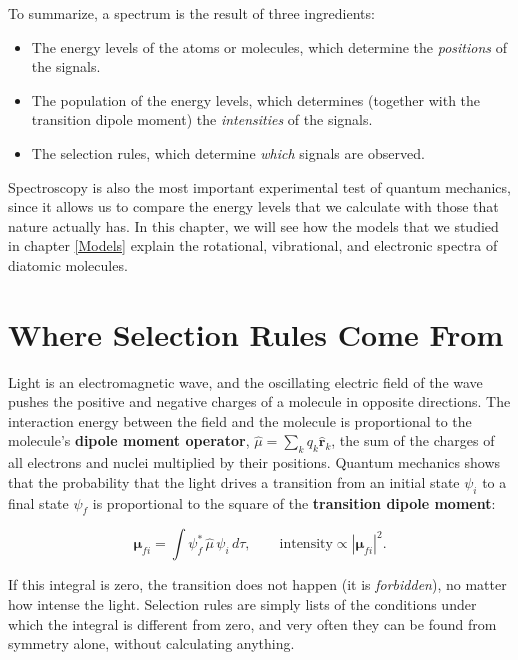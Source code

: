 \documentclass[
  english,
  9pt,
]{extbook}
\providecommand{\tightlist}{%
  \setlength{\itemsep}{0pt}\setlength{\parskip}{0pt}}
\theoremstyle{definition}
\theoremstyle{definition}
\theoremstyle{definition}
\theoremstyle{definition}
\theoremstyle{remark}
\begin{document}
To summarize, a spectrum is the result of three ingredients:

\begin{itemize}
\tightlist
\item
  The energy levels of the atoms or molecules, which determine the \emph{positions} of the signals.
\item
  The population of the energy levels, which determines (together with the transition dipole moment) the \emph{intensities} of the signals.
\item
  The selection rules, which determine \emph{which} signals are observed.
\end{itemize}

Spectroscopy is also the most important experimental test of quantum mechanics, since it allows us to compare the energy levels that we calculate with those that nature actually has. In this chapter, we will see how the models that we studied in chapter \ref{Models} explain the rotational, vibrational, and electronic spectra of diatomic molecules.

\section{Where Selection Rules Come From}\label{SelectionRules}

Light is an electromagnetic wave, and the oscillating electric field of the wave pushes the positive and negative charges of a molecule in opposite directions. The interaction energy between the field and the molecule is proportional to the molecule's \textbf{dipole moment operator}, \(\hat{\mu} = \sum_k q_k \hat{\mathbf{r}}_k\), the sum of the charges of all electrons and nuclei multiplied by their positions. Quantum mechanics shows that the probability that the light drives a transition from an initial state \(\psi_i\) to a final state \(\psi_f\) is proportional to the square of the \textbf{transition dipole moment}:

\begin{equation}
\boldsymbol{\mu}_{fi} = \int \psi_f^*\, \hat{\mu}\, \psi_i \, d\tau, \qquad \text{intensity} \propto |\boldsymbol{\mu}_{fi}|^2.
\label{eq:tdm1}
\end{equation}

If this integral is zero, the transition does not happen (it is \emph{forbidden}), no matter how intense the light. Selection rules are simply lists of the conditions under which the integral is different from zero, and very often they can be found from symmetry alone, without calculating anything.
\end{document}
